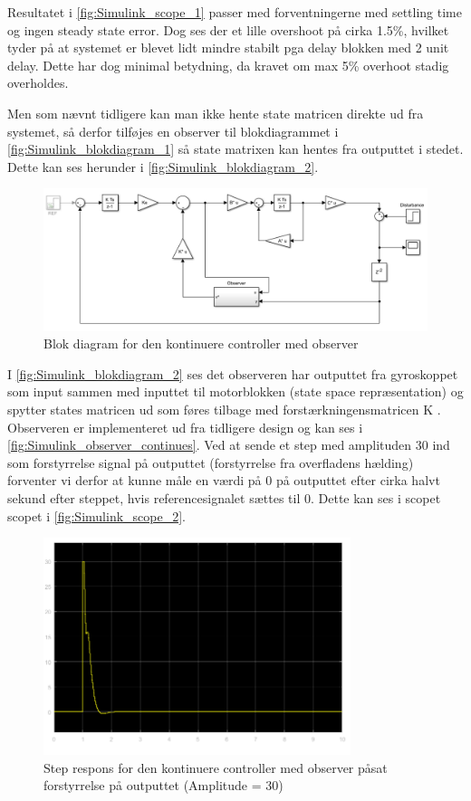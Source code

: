 Resultatet i \autoref{fig:Simulink_scope_1} passer med forventningerne med settling time og ingen steady state error. Dog ses der et lille overshoot på cirka 1.5\%, hvilket tyder på at systemet er blevet lidt mindre stabilt pga delay blokken med 2 unit delay. Dette har dog minimal betydning, da kravet om max 5\% overhoot stadig overholdes.

Men som nævnt tidligere kan man ikke hente state matricen direkte ud fra systemet, så derfor tilføjes en observer til blokdiagrammet i \autoref{fig:Simulink_blokdiagram_1} så state matrixen kan hentes fra outputtet i stedet. Dette kan ses herunder i \autoref{fig:Simulink_blokdiagram_2}.

\begin{figure}[H]
	\centering
	\includegraphics[width = 1\textwidth]{figur/Simulink_blokdiagram_2}
	\caption{Blok diagram for den kontinuere controller med observer}
	\label{fig:Simulink_blokdiagram_2}
\end{figure}
I \autoref{fig:Simulink_blokdiagram_2} ses det observeren har outputtet fra gyroskoppet som input sammen med inputtet til motorblokken (state space repræsentation) og spytter states matricen ud som føres tilbage med forstærkningensmatricen K . Observeren er implementeret ud fra tidligere design og kan ses i \autoref{fig:Simulink_observer_continues}. Ved at sende et step med amplituden 30 ind som forstyrrelse signal på outputtet (forstyrrelse fra overfladens hælding) forventer vi derfor at kunne måle en værdi på 0 på outputtet efter cirka halvt sekund efter steppet, hvis referencesignalet sættes til 0. Dette kan ses i scopet scopet i \autoref{fig:Simulink_scope_2}.
 
\begin{figure}[H]
	\centering
	\includegraphics[width = 0.8\textwidth]{figur/Simulink_scope_2}
	\caption{Step respons for den kontinuere controller med observer påsat forstyrrelse på outputtet (Amplitude = 30)}
	\label{fig:Simulink_scope_2}
\end{figure}

